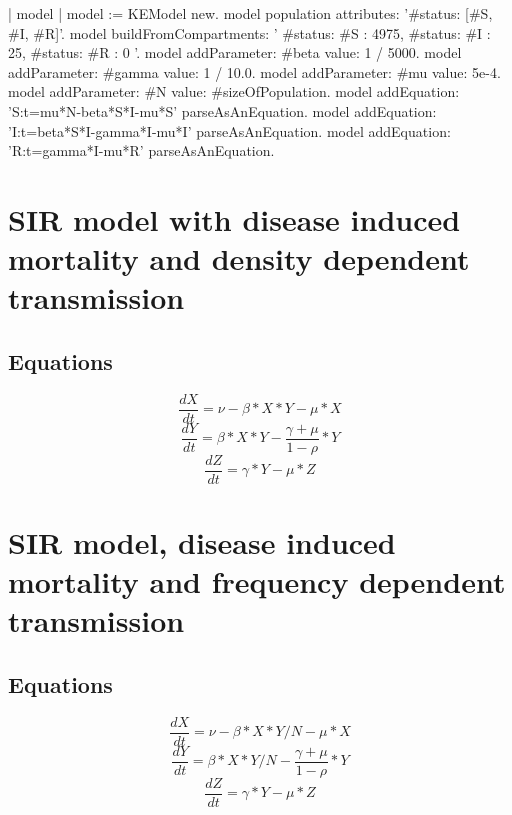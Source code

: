 \documentclass[a4paper,10pt,twoside]{book}
\begin{document}

\begin{code}{}
| model |
	model := KEModel new.
	model population attributes: '{#status: [#S, #I, #R]}'.
  model
		buildFromCompartments:
			'{
		{ #status: #S }: 4975,
		{ #status: #I }: 25,
		{ #status: #R }: 0
	}'.
	model addParameter: #beta value: 1 / 5000.
	model addParameter: #gamma value: 1 / 10.0.
	model addParameter: #mu value: 5e-4.
	model addParameter: #N value: #sizeOfPopulation.
	model addEquation: 'S:t=mu*N-beta*S*I-mu*S' parseAsAnEquation.
	model addEquation: 'I:t=beta*S*I-gamma*I-mu*I' parseAsAnEquation.
	model addEquation: 'R:t=gamma*I-mu*R' parseAsAnEquation.
\end{code}

\section{ SIR model with disease induced mortality and density dependent transmission}\subsection{ Equations}

\begin{equation}
\frac{dX}{dt} = \nu-\beta*X*Y-\mu*X
\end{equation}
\begin{equation}
\frac{dY}{dt} = \beta*X*Y-\frac{\gamma+\mu}{1-\rho}*Y
\end{equation}
\begin{equation}
\frac{dZ}{dt} = \gamma*Y-\mu*Z
\end{equation}
\section{ SIR model, disease induced mortality and frequency dependent transmission}\subsection{ Equations}

\begin{equation}
\frac{dX}{dt} = \nu-\beta*X*Y/N-\mu*X
\end{equation}
\begin{equation}
\frac{dY}{dt} = \beta*X*Y/N-\frac{\gamma+\mu}{1-\rho}*Y
\end{equation}
\begin{equation}
\frac{dZ}{dt} = \gamma*Y-\mu*Z
\end{equation}
\end{document}
